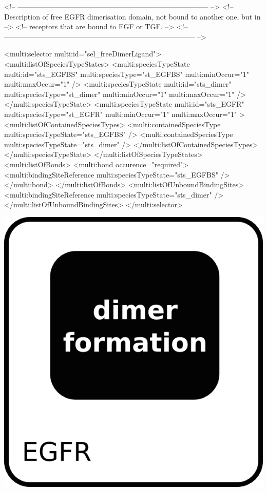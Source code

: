 \begin{example}
<!-- -------------------------------------------------------------------------------- -->
<!-- Description of free EGFR dimerisation domain, not bound to another one, but in   --> 
<!-- receptors that are bound to EGF or TGF.                                          -->
<!-- -------------------------------------------------------------------------------- -->

      <multi:selector multi:id="sel_freeDimerLigand">
        <multi:listOfSpeciesTypeStates>
          <multi:speciesTypeState multi:id="sts_EGFBS" multi:speciesType="st_EGFBS" 
                                   multi:minOccur="1" multi:maxOccur="1" />
          <multi:speciesTypeState multi:id="sts_dimer" multi:speciesType="st_dimer" 
                                   multi:minOccur="1" multi:maxOccur="1" />
          </multi:speciesTypeState>
          <multi:speciesTypeState multi:id="sts_EGFR" multi:speciesType="st_EGFR" 
                                   multi:minOccur="1" multi:maxOccur="1" >
            <multi:listOfContainedSpeciesTypes>
              <multi:containedSpeciesType multi:speciesTypeState="sts_EGFBS" /> 
              <multi:containedSpeciesType multi:speciesTypeState="sts_dimer" /> 
            </multi:listOfContainedSpeciesTypes>            
          </multi:speciesTypeState>
        </multi:listOfSpeciesTypeStates>
        <multi:listOfBonds>
          <multi:bond occurence="required">
            <multi:bindingSiteReference multi:speciesTypeState="sts_EGFBS" />
          </multi:bond>
        </multi:listOfBonds>
        <multi:listOfUnboundBindingSites>
          <multi:bindingSiteReference multi:speciesTypeState="sts_dimer" />
        </multi:listOfUnboundBindingSites>
      </multi:selector>
\end{example}

\includegraphics{figs/pngs/sel_boundDimer.png}

